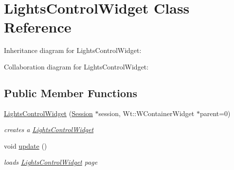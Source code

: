 \hypertarget{classLightsControlWidget}{}\section{Lights\+Control\+Widget Class Reference}
\label{classLightsControlWidget}


Inheritance diagram for Lights\+Control\+Widget\+:


Collaboration diagram for Lights\+Control\+Widget\+:
\subsection*{Public Member Functions}
\begin{DoxyCompactItemize}
\item 
\hyperlink{classLightsControlWidget_a15e1439f70466b481134b8eba8f3cd5d}{Lights\+Control\+Widget} (\hyperlink{classSession}{Session} $\ast$session, Wt\+::\+W\+Container\+Widget $\ast$parent=0)
\begin{DoxyCompactList}\small\item\em creates a \hyperlink{classLightsControlWidget}{Lights\+Control\+Widget} \end{DoxyCompactList}\item 
void \hyperlink{classLightsControlWidget_a595489c5a7076eeaf32fee9d48bbd1fe}{update} ()
\begin{DoxyCompactList}\small\item\em loads \hyperlink{classLightsControlWidget}{Lights\+Control\+Widget} page \end{DoxyCompactList}\end{DoxyCompactItemize}

